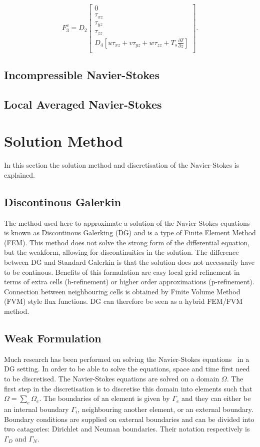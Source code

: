 \documentclass{report}
\newcommand{\dz}[1]{\frac{\partial #1}{\partial z}}
\begin{document}
\begin{equation*}
{F}_{3}^v = D_2
\left[
\begin{array}{c}
0		\\
\tau_{xz}	 	\\
\tau_{yz}		\\
\tau_{zz}		\\
D_4 \left[
u\tau_{xz} + v\tau_{yz} + w\tau_{zz} + T_s\dz{T}
\right]	\\
\end{array}
\right].
\end{equation*}

\section{Incompressible Navier-Stokes}
\section{Local Averaged Navier-Stokes}


\chapter{Solution Method}
In this section the solution method and discretisation of the Navier-Stokes is explained. 
\section{Discontinous Galerkin}
The method used here to approximate a solution of the Navier-Stokes equations is known as Discontinous Galerking (DG) and is a type of Finite Element Method (FEM). This method does not solve the strong form of the differential equation, but the weakform, allowing for discontinuities in the solution. The difference between DG and Standard Galerkin is that the solution does not necessarily have to be continous. Benefits of this formulation are easy local grid refinement in terms of extra cells (h-refinement) or higher order approximations (p-refinement). Connection between neighbouring cells is obtained by Finite Volume Method (FVM) style flux functions. DG can therefore be seen as a hybrid FEM/FVM method.

\section{Weak Formulation}
Much research has been performed on solving the Navier-Stokes equations~\cite{} in a DG setting. In order to be able to solve the equations, space and time first need to be discretised. The Navier-Stokes equations are solved on a domain $\Omega$. The first step in the discretisation is to discretise this domain into elements such that $ \Omega = \sum_e \Omega_e$. The boundaries of an element is given by $\Gamma_e$ and they can either be an internal boundary $\Gamma_i$, neighbouring another element, or an external boundary. Boundary conditions are supplied on external boundaries and can be divided into two catagories: Dirichlet and Neuman boundaries. Their notation respectively is $\Gamma_D$ and $\Gamma_N$.
\end{document}
